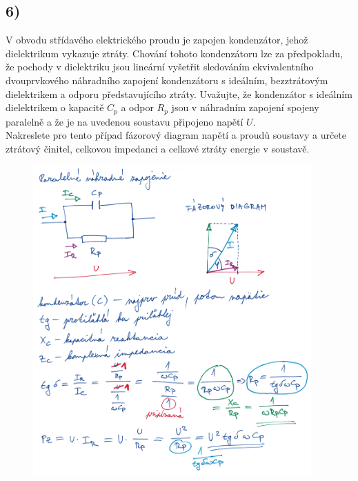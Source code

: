 \newpage


\subsection*{6)}
V obvodu střídavého elektrického proudu je zapojen kondenzátor, jehož dielektrikum vykazuje ztráty. Chování tohoto kondenzátoru lze za předpokladu, že pochody v dielektriku jsou lineární vyšetřit sledováním ekvivalentního dvouprvkového náhradního zapojení kondenzátoru s ideálním, bezztrátovým dielektrikem a odporu představujícího ztráty. Uvažujte, že kondenzátor s ideálním dielektrikem o kapacitě $C_p$ a odpor $R_p$ jsou v náhradním zapojení spojeny paralelně a že je na uvedenou soustavu připojeno napětí $U$. \\
Nakreslete pro tento případ fázorový diagram napětí a proudů soustavy a určete ztrátový činitel, celkovou impedanci a celkové ztráty energie v soustavě.

\begin{figure}[h]
    \centering
    \includegraphics*[width=0.95\textwidth]{images/diel6.jpg}
\end{figure}

\newpage

